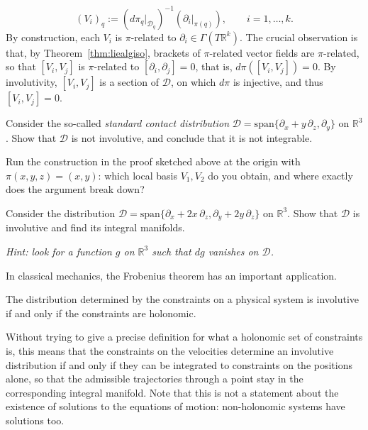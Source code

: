 \begin{equation}
  (V_i)_q := \left(d\pi_q\big|_{\mathcal{D}_q}\right)^{-1}\left(\partial_i|_{\pi(q)}\right), \qquad i=1,\dots,k.
\end{equation}
By construction, each $V_i$ is $\pi$-related to $\partial_i\in\Gamma(T\mathbb{R}^k)$. The crucial observation is that, by Theorem~\ref{thm:liealgiso}, brackets of $\pi$-related vector fields are $\pi$-related, so that $[V_i,V_j]$ is $\pi$-related to $[\partial_i,\partial_j]=0$, that is, $d\pi([V_i,V_j])=0$.
By involutivity, $[V_i,V_j]$ is a section of $\mathcal{D}$, on which $d\pi$ is injective, and thus $[V_i,V_j]=0$.\par

\begin{exercise}
  Consider the so-called \emph{standard contact distribution} $\mathcal{D}=\text{span}\{\partial_x+y\,\partial_z,\partial_y\}$ on $\mathbb{R}^3$.
  Show that $\mathcal{D}$ is not involutive, and conclude that it is not integrable.

  Run the construction in the proof sketched above at the origin with $\pi(x,y,z)=(x,y)$: which local basis $V_1,V_2$ do you obtain, and where exactly does the argument break down?
\end{exercise}
\begin{exercise}
  Consider the distribution $\mathcal{D}=\text{span}\{\partial_x+2x\,\partial_z,\partial_y+2y\,\partial_z\}$ on $\mathbb{R}^3$.
  Show that $\mathcal{D}$ is involutive and find its integral manifolds.

  \emph{Hint: look for a function $g$ on $\mathbb{R}^3$ such that $dg$ vanishes on $\mathcal{D}$.}
\end{exercise}

In classical mechanics, the Frobenius theorem has an important application.
\begin{corollary}
  The distribution determined by the constraints on a physical system is involutive if and only if the constraints are holonomic.
\end{corollary}
Without trying to give a precise definition for what a holonomic set of constraints is, this means that the constraints on the velocities determine an involutive distribution if and only if they can be integrated to constraints on the positions alone, so that the admissible trajectories through a point stay in the corresponding integral manifold. Note that this is not a statement about the existence of solutions to the equations of motion: non-holonomic systems have solutions too.

